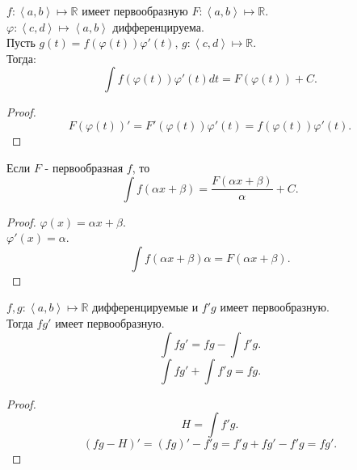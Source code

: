 \documentclass[11pt, oneside]{article}   	%
\begin{document}
         \begin{theorem}
             $f: \left<a, b\right> \mapsto \mathbb{R}$ имеет первообразную $F : \left<a, b\right> \mapsto \mathbb{R}$.\\
             $\varphi : \left<c, d\right> \mapsto \left<a, b\right>$ дифференцируема.\\
             Пусть $g(t) = f(\varphi(t))\varphi'(t)$, $g : \left<c, d\right> \mapsto \mathbb{R}$.\\
             Тогда:
             \[ \int f(\varphi(t))\varphi'(t)dt = F(\varphi(t)) + C .\]
             \begin{proof}
                 \[ F(\varphi(t))' = F'(\varphi(t))\varphi'(t) = f(\varphi(t))\varphi'(t) .\] 
             \end{proof}
         \end{theorem}
         \begin{tlemma}
             Если $F$ - первообразная $f$, то
             \[ \int f(\alpha x + \beta) = \frac{F(\alpha x + \beta)}{\alpha} + C.\]
             \begin{proof}
                 $\varphi(x) = \alpha x + \beta$.\\
                 $\varphi'(x) = \alpha$.\\
                 \[ \int f(\alpha x + \beta)\alpha = F(\alpha x + \beta) .\] 
             \end{proof}
         \end{tlemma}
         \begin{theorem}
             $f,g: \left<a, b\right> \mapsto \mathbb{R}$ дифференцируемые и $f'g$ имеет первообразную.\\
             Тогда $fg'$ имеет первообразную.\\
             \[ \int fg' = fg - \int f'g .\]
             \[ \int fg' + \int f'g = fg .\] 
             \begin{proof}
             \[ H = \int f'g.\]
             \[ (fg-H)' = (fg)' - f'g = f'g + fg' - f'g = fg' .\] 
             \end{proof}
         \end{theorem}
\end{document}
